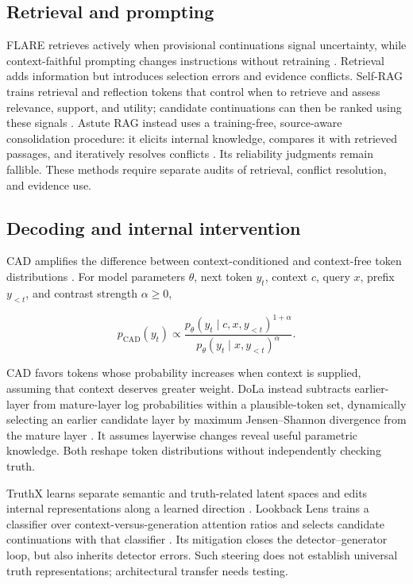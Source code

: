 \subsection{Retrieval and prompting}

FLARE retrieves actively when provisional continuations signal uncertainty, while context-faithful prompting changes instructions without retraining \citep{jiang-etal-2023-active,zhou-etal-2023-context}. Retrieval adds information but introduces selection errors and evidence conflicts. Self-RAG trains retrieval and reflection tokens that control when to retrieve and assess relevance, support, and utility; candidate continuations can then be ranked using these signals \citep{extselfrag2024}. Astute RAG instead uses a training-free, source-aware consolidation procedure: it elicits internal knowledge, compares it with retrieved passages, and iteratively resolves conflicts \citep{wang-etal-2025-astute}. Its reliability judgments remain fallible. These methods require separate audits of retrieval, conflict resolution, and evidence use.

\subsection{Decoding and internal intervention}

CAD amplifies the difference between context-conditioned and context-free token distributions \citep{shi-etal-2024-trusting}. For model parameters $\theta$, next token $y_t$, context $c$, query $x$, prefix $y_{<t}$, and contrast strength $\alpha\geq0$,

\begin{equation}\label{eq:cad}
p_{\mathrm{CAD}}(y_t)\propto\frac{p_\theta(y_t\mid c,x,y_{<t})^{1+\alpha}}{p_\theta(y_t\mid x,y_{<t})^\alpha}.
\end{equation}

CAD favors tokens whose probability increases when context is supplied, assuming that context deserves greater weight. DoLa instead subtracts earlier-layer from mature-layer log probabilities within a plausible-token set, dynamically selecting an earlier candidate layer by maximum Jensen--Shannon divergence from the mature layer \citep{extdola2024}. It assumes layerwise changes reveal useful parametric knowledge. Both reshape token distributions without independently checking truth.

TruthX learns separate semantic and truth-related latent spaces and edits internal representations along a learned direction \citep{zhang-etal-2024-truthx}. Lookback Lens trains a classifier over context-versus-generation attention ratios and selects candidate continuations with that classifier \citep{chuang-etal-2024-lookback}. Its mitigation closes the detector--generator loop, but also inherits detector errors. Such steering does not establish universal truth representations; architectural transfer needs testing.

